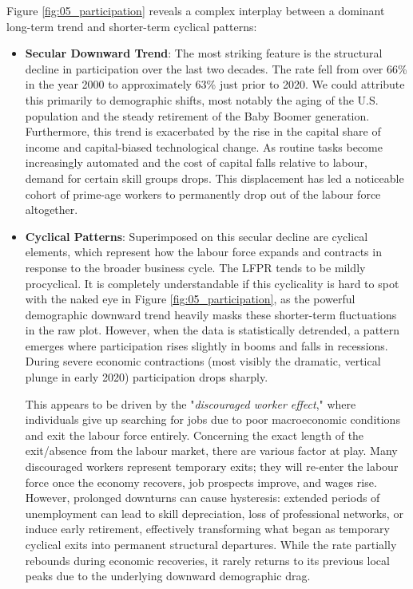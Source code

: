 \documentclass[dvipsnames,11pt]{article}
\begin{document}
\begin{enumerate}
\begin{solution}
                    Figure \ref{fig:05_participation} reveals a complex interplay between a dominant long-term trend and shorter-term cyclical patterns:
                    \begin{itemize}
                        \item \textbf{Secular Downward Trend}: The most striking feature is the structural decline in participation over the last two decades. The rate fell from over 66\% in the year 2000 to approximately 63\% just prior to 2020. We could attribute this primarily to demographic shifts, most notably the aging of the U.S. population and the steady retirement of the Baby Boomer generation. Furthermore, this trend is exacerbated by the rise in the capital share of income and capital-biased technological change. As routine tasks become increasingly automated and the cost of capital falls relative to labour, demand for certain skill groups drops. This displacement has led a noticeable cohort of prime-age workers to permanently drop out of the labour force altogether.

                        \item \textbf{Cyclical Patterns}: Superimposed on this secular decline are cyclical elements, which represent how the labour force expands and contracts in response to the broader business cycle. The LFPR tends to be mildly procyclical. It is completely understandable if this cyclicality is hard to spot with the naked eye in Figure \ref{fig:05_participation}, as the powerful demographic downward trend heavily masks these shorter-term fluctuations in the raw plot. However, when the data is statistically detrended, a pattern emerges where participation rises slightly in booms and falls in recessions. During severe economic contractions (most visibly the dramatic, vertical plunge in early 2020) participation drops sharply. 
                        
                        This appears to be driven by the "\textit{discouraged worker effect}," where individuals give up searching for jobs due to poor macroeconomic conditions and exit the labour force entirely. Concerning the exact length of the exit/absence from the labour market, there are various factor at play. Many discouraged workers represent temporary exits; they will re-enter the labour force once the economy recovers, job prospects improve, and wages rise. However, prolonged downturns can cause hysteresis: extended periods of unemployment can lead to skill depreciation, loss of professional networks, or induce early retirement, effectively transforming what began as temporary cyclical exits into permanent structural departures. While the rate partially rebounds during economic recoveries, it rarely returns to its previous local peaks due to the underlying downward demographic drag.
                    \end{itemize}
                    

\end{solution}
\end{enumerate}
\end{document}

